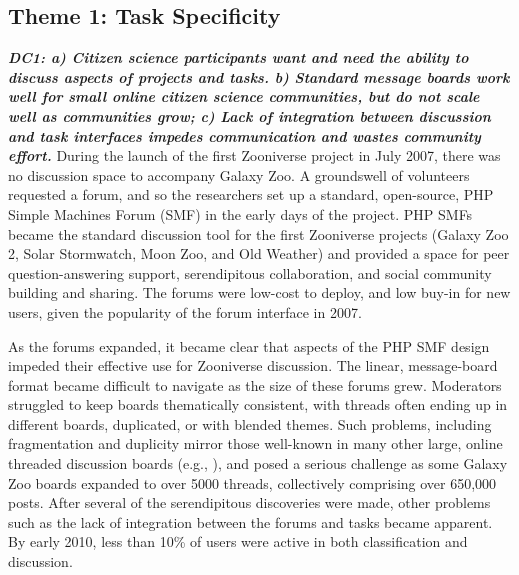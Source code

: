 \documentclass{sigchi}
\begin{document}
\begin{spacing}{0.97}
\subsection{Theme 1: Task Specificity}


\textbf{\emph{DC1: a) Citizen science participants want and need the ability to discuss aspects of projects and tasks. b) Standard message boards work well for small online citizen science communities, but do not scale well as communities grow; c) Lack of integration between discussion and task interfaces impedes communication and wastes community effort.}} During the launch of the first Zooniverse project in July 2007, there was no discussion space to accompany Galaxy Zoo. A groundswell of volunteers requested a forum, and so the researchers set up a standard, open-source, PHP Simple Machines Forum (SMF) in the early days of the project. PHP SMFs became the standard discussion tool for the first Zooniverse projects (Galaxy Zoo 2, Solar Stormwatch, Moon Zoo, and Old Weather) and provided a space for peer question-answering support, serendipitous collaboration, and social community building and sharing. The forums were low-cost to deploy, and low buy-in for new users, given the popularity of the forum interface in 2007. 

As the forums expanded, it became clear that aspects of the PHP SMF design impeded their effective use for Zooniverse discussion. The linear, message-board format became difficult to navigate as the size of these forums grew. Moderators struggled to keep boards thematically consistent, with threads often ending up in different boards, duplicated, or with blended themes. Such problems, including fragmentation and duplicity mirror those well-known in many other large, online threaded discussion boards (e.g., \cite{murphy2004graduate}), and posed a serious challenge as some Galaxy Zoo boards expanded to over 5000 threads, collectively comprising over 650,000 posts. After several of the serendipitous discoveries were made, other problems such as the lack of integration between the forums and tasks became apparent. By early 2010, less than 10\% of users were active in both classification and discussion.


\end{spacing}
\end{document}
